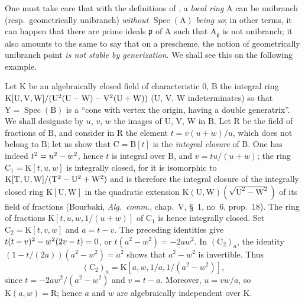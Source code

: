 \begin{env}[6.15.2]
\label{IV.6.15.2}
One must take care that with the definitions of , a \emph{local
ring} $\mathrm{A}$ can be unibranch (resp.\ geometrically unibranch) \emph{without} $\operatorname{Spec}(\mathrm{A})$
\emph{being so}; in other terms, it can happen that there are prime ideals $\mathfrak{p}$ of $\mathrm{A}$ such
that $\mathrm{A}_\mathfrak{p}$ is not unibranch; it also amounts to the same to say that on a prescheme,
the notion of geometrically unibranch point \emph{is not stable by generization}. We
shall see this on the following example.
\end{env}


Let $\mathrm{K}$ be an algebraically closed field of characteristic $0$, $\mathrm{B}$ the integral ring
$\mathrm{K}[\mathrm{U},\mathrm{V},\mathrm{W}]/(\mathrm{U}^2(\mathrm{U}-\mathrm{W})-\mathrm{V}^2(\mathrm{U}+\mathrm{W}))$ ($\mathrm{U}$, $\mathrm{V}$, $\mathrm{W}$ indeterminates) so that
$\mathrm{Y}=\operatorname{Spec}(\mathrm{B})$ is a ``cone with vertex the origin, having a double generatrix''.
We shall designate by $u$, $v$, $w$ the images of $\mathrm{U}$, $\mathrm{V}$, $\mathrm{W}$ in $\mathrm{B}$. Let $\mathrm{R}$ be the field of
fractions of $\mathrm{B}$, and consider in $\mathrm{R}$ the element $t=v(u+w)/u$, which does not belong
to $\mathrm{B}$; let us show that $\mathrm{C}=\mathrm{B}[t]$ is the \emph{integral closure} of $\mathrm{B}$. One has indeed $t^2=u^2- w^2$,
hence $t$ is integral over $\mathrm{B}$, and $v=tu/(u+w)$; the ring $\mathrm{C}_1=\mathrm{K}[t,u,w]$ is integrally
closed, for it is isomorphic to $\mathrm{K}[\mathrm{T},\mathrm{U},\mathrm{W}]/(\mathrm{T}^2-\mathrm{U}^2+\mathrm{W}^2)$ and is therefore the integral
closure of the integrally closed ring $\mathrm{K}[\mathrm{U},\mathrm{W}]$ in the quadratic extension
$\mathrm{K}(\mathrm{U},\mathrm{W})(\sqrt{\mathrm{U}^2-\mathrm{W}^2})$ of its field of fractions (Bourbaki, \emph{Alg.~comm.}, chap.~V, \S~1,
no~6, prop.~18). The ring of fractions $\mathrm{K}[t,u,w,1/(u+w)]$ of $\mathrm{C}_1$ is hence
integrally closed. Set $\mathrm{C}_2=\mathrm{K}[t,v,w]$ and $a=t-v$. The preceding identities give
$t(t- v)^2- w^2(2v- t)=0$, or $t(a^2-w^2)=-2aw^2$.
In $(\mathrm{C}_2)_a$, the identity $(1-t/(2a))(a^2-w^2)=a^2$ shows that
$a^2-w^2$ is invertible. Thus
\[
(\mathrm{C}_2)_a=\mathrm{K}[a,w,1/a,1/(a^2-w^2)],
\]
since $t=-2aw^2/(a^2-w^2)$ and $v=t-a$. Moreover, $u=vw/a$, so
$\mathrm{K}(a,w)=\mathrm{R}$; hence $a$ and $w$ are algebraically independent over $\mathrm{K}$.
